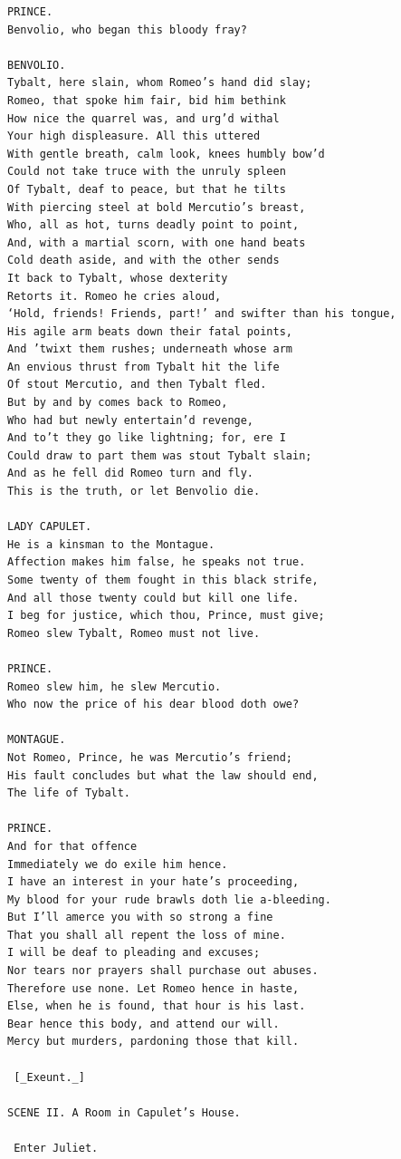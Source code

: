 \documentclass{article}
\begin{document}
\begin{verbatim}
PRINCE.
Benvolio, who began this bloody fray?

BENVOLIO.
Tybalt, here slain, whom Romeo’s hand did slay;
Romeo, that spoke him fair, bid him bethink
How nice the quarrel was, and urg’d withal
Your high displeasure. All this uttered
With gentle breath, calm look, knees humbly bow’d
Could not take truce with the unruly spleen
Of Tybalt, deaf to peace, but that he tilts
With piercing steel at bold Mercutio’s breast,
Who, all as hot, turns deadly point to point,
And, with a martial scorn, with one hand beats
Cold death aside, and with the other sends
It back to Tybalt, whose dexterity
Retorts it. Romeo he cries aloud,
‘Hold, friends! Friends, part!’ and swifter than his tongue,
His agile arm beats down their fatal points,
And ’twixt them rushes; underneath whose arm
An envious thrust from Tybalt hit the life
Of stout Mercutio, and then Tybalt fled.
But by and by comes back to Romeo,
Who had but newly entertain’d revenge,
And to’t they go like lightning; for, ere I
Could draw to part them was stout Tybalt slain;
And as he fell did Romeo turn and fly.
This is the truth, or let Benvolio die.

LADY CAPULET.
He is a kinsman to the Montague.
Affection makes him false, he speaks not true.
Some twenty of them fought in this black strife,
And all those twenty could but kill one life.
I beg for justice, which thou, Prince, must give;
Romeo slew Tybalt, Romeo must not live.

PRINCE.
Romeo slew him, he slew Mercutio.
Who now the price of his dear blood doth owe?

MONTAGUE.
Not Romeo, Prince, he was Mercutio’s friend;
His fault concludes but what the law should end,
The life of Tybalt.

PRINCE.
And for that offence
Immediately we do exile him hence.
I have an interest in your hate’s proceeding,
My blood for your rude brawls doth lie a-bleeding.
But I’ll amerce you with so strong a fine
That you shall all repent the loss of mine.
I will be deaf to pleading and excuses;
Nor tears nor prayers shall purchase out abuses.
Therefore use none. Let Romeo hence in haste,
Else, when he is found, that hour is his last.
Bear hence this body, and attend our will.
Mercy but murders, pardoning those that kill.

 [_Exeunt._]

SCENE II. A Room in Capulet’s House.

 Enter Juliet.


\end{verbatim}
\end{document}

